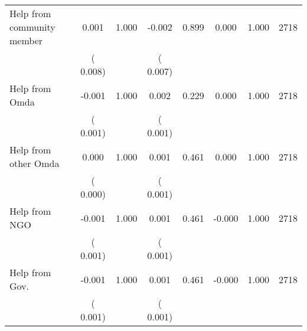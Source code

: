 \begin{tabular}{l*{7}{c}}
 Help from community member       &              0.001       &        1.000  &             -0.002       &        0.899  &              0.000       &              1.000 &  2718 \\ 
                       &       (       0.008)             &                               &       (       0.007)                     &                               &                                               &                                &                      \\ 

 Help from Omda       &             -0.001       &        1.000  &              0.002       &        0.229  &              0.000       &              1.000 &  2718 \\ 
                       &       (       0.001)             &                               &       (       0.001)                     &                               &                                               &                                &                      \\ 

 Help from other Omda       &              0.000       &        1.000  &              0.001       &        0.461  &              0.000       &              1.000 &  2718 \\ 
                       &       (       0.000)             &                               &       (       0.001)                     &                               &                                               &                                &                      \\ 

 Help from NGO       &             -0.001       &        1.000  &              0.001       &        0.461  &             -0.000       &              1.000 &  2718 \\ 
                       &       (       0.001)             &                               &       (       0.001)                     &                               &                                               &                                &                      \\ 

 Help from Gov.       &             -0.001       &        1.000  &              0.001       &        0.461  &             -0.000       &              1.000 &  2718 \\ 
                       &       (       0.001)             &                               &       (       0.001)                     &                               &                                               &                                &                      \\ 

\hline \end{tabular}